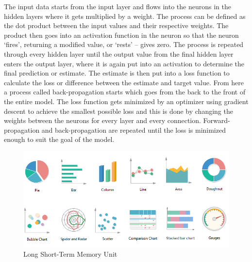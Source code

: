 \documentclass[12pt]{article}
\begin{document}
            The input data starts from the input layer and flows into the neurons in the hidden layers where it gets multiplied by a weight. 
            The process can be defined as the dot product between the input values and their respective weights. 
            The product then goes into an activation function in the neuron 
            so that the neuron ‘fires’, returning a modified value, or ‘rests’ -- gives zero. 
            The process is repeated through every hidden layer until the output value from the final hidden layer enters the output layer, 
            where it is again put into an activation to determine the final prediction or estimate. 
            The estimate is then put into a loss function to calculate the loss or difference between the estimate and target value. 
            From here a process called back-propagation starts which goes from the back to the front of the entire model. 
            The loss function gets minimized by an optimizer using gradient descent to achieve the smallest possible loss 
            and this is done by changing the weights between the neurons for every layer and every connection. 
            Forward-propagation and back-propagation are repeated until the loss is minimized enough to suit the goal of the model.
        
            
            \begin{figure}[ht]
            
                \begin{center}

                    \includegraphics[scale=0.5]{types-of-graphs.png}
                    \caption{Long Short-Term Memory Unit \cite{yan2016}}
        
                \end{center}
                
            \end{figure}
\end{document}
